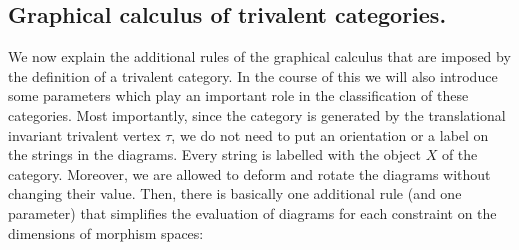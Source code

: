 \subsection*{Graphical calculus of trivalent categories.} 

	We now explain the additional rules of the graphical calculus that are imposed by the definition of a trivalent category. In the course of this we will also introduce some parameters which play an important role in the classification of these categories. Most importantly, since the category is generated by the translational invariant trivalent vertex $\tau$, we do not need to put an orientation or a label on the strings in the diagrams. Every string is labelled with the object $X$ of the category. Moreover, we are allowed to deform and rotate the diagrams without changing their value. Then, there is basically one additional rule (and one parameter) that simplifies the evaluation of diagrams for each constraint on the dimensions of morphism spaces:
